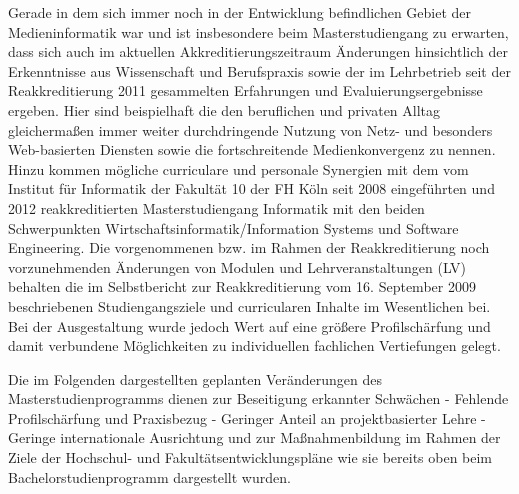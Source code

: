 Gerade in dem sich immer noch in der Entwicklung befindlichen Gebiet der
Medieninformatik war und ist insbesondere beim Masterstudiengang zu
erwarten, dass sich auch im aktuellen Akkreditierungszeitraum Änderungen
hinsichtlich der Erkenntnisse aus Wissenschaft und Berufspraxis sowie
der im Lehrbetrieb seit der Reakkreditierung 2011 gesammelten
Erfahrungen und Evaluierungsergebnisse ergeben. Hier sind beispielhaft
die den beruflichen und privaten Alltag gleichermaßen immer weiter
durchdringende Nutzung von Netz- und besonders Web-basierten Diensten
sowie die fortschreitende Medienkonvergenz zu nennen. Hinzu kommen
mögliche curriculare und personale Synergien mit dem vom Institut für
Informatik der Fakultät 10 der FH Köln seit 2008 eingeführten und 2012
reakkreditierten Masterstudiengang Informatik mit den beiden
Schwerpunkten Wirtschaftsinformatik/Information Systems und Software
Engineering. Die vorgenommenen bzw. im Rahmen der Reakkreditierung noch
vorzunehmenden Änderungen von Modulen und Lehrveranstaltungen (LV)
behalten die im Selbstbericht zur Reakkreditierung vom 16. September
2009 beschriebenen Studiengangsziele und curricularen Inhalte im
Wesentlichen bei. Bei der Ausgestaltung wurde jedoch Wert auf eine
größere Profilschärfung und damit verbundene Möglichkeiten zu
individuellen fachlichen Vertiefungen gelegt.

Die im Folgenden dargestellten geplanten Veränderungen des
Masterstudienprogramms dienen zur Beseitigung erkannter Schwächen -
Fehlende Profilschärfung und Praxisbezug - Geringer Anteil an
projektbasierter Lehre - Geringe internationale Ausrichtung und zur
Maßnahmenbildung im Rahmen der Ziele der Hochschul- und
Fakultätsentwicklungspläne wie sie bereits oben beim
Bachelorstudienprogramm dargestellt wurden.

